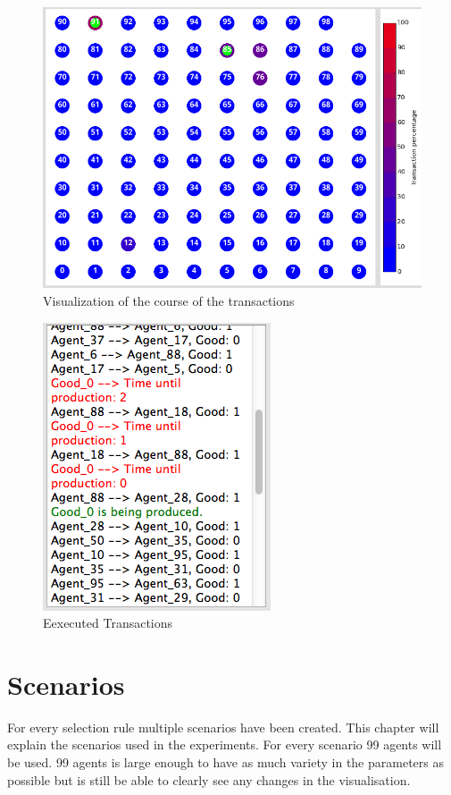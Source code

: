 \documentclass[twoside,openright]{uva-bachelor-thesis}
\begin{document}
\begin{figure}
  \centering
  \includegraphics[scale=0.4]{Simulation2_figures/Visualization}
  \caption{Visualization of the course of the transactions}
\end{figure}

\begin{figure}
  \centering
  \includegraphics[scale=0.4]{Simulation2_figures/Transactions}
  \caption{Eexecuted Transactions}
\end{figure}


\chapter{Scenarios}
For every selection rule multiple scenarios have been created. This chapter will explain the scenarios used in the experiments. For every scenario 99 agents will be used. 99 agents is large enough to have as much variety in the parameters as possible but is still be able to clearly see any changes in the visualisation.  
\end{document}
